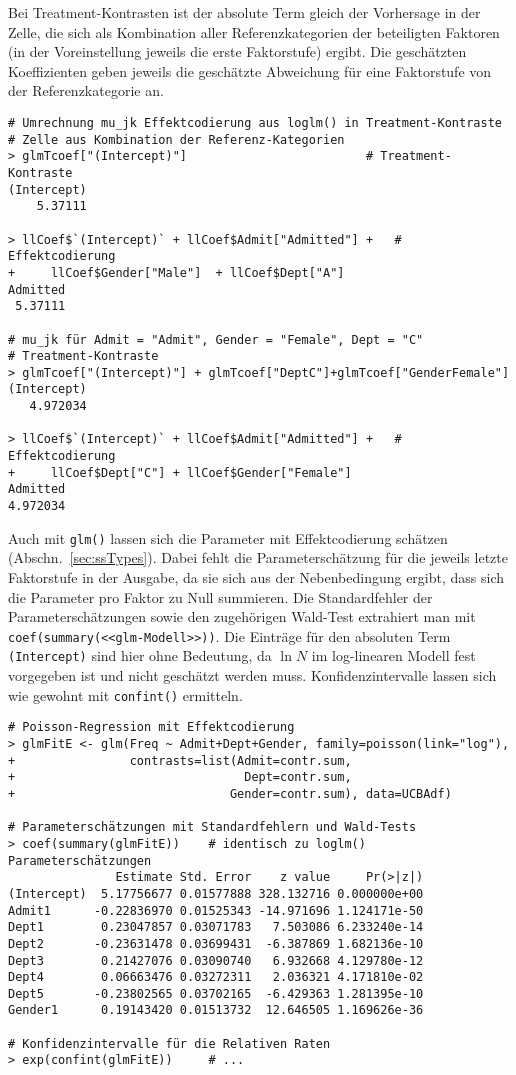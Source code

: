 Bei Treatment-Kontrasten ist der absolute Term gleich der Vorhersage in der Zelle, die sich als Kombination aller Referenzkategorien der beteiligten Faktoren (in der Voreinstellung jeweils die erste Faktorstufe) ergibt. Die geschätzten Koeffizienten geben jeweils die geschätzte Abweichung für eine Faktorstufe von der Referenzkategorie an.
\begin{lstlisting}
# Umrechnung mu_jk Effektcodierung aus loglm() in Treatment-Kontraste
# Zelle aus Kombination der Referenz-Kategorien
> glmTcoef["(Intercept)"]                         # Treatment-Kontraste
(Intercept)
    5.37111

> llCoef$`(Intercept)` + llCoef$Admit["Admitted"] +   # Effektcodierung
+     llCoef$Gender["Male"]  + llCoef$Dept["A"]
Admitted
 5.37111

# mu_jk für Admit = "Admit", Gender = "Female", Dept = "C"
# Treatment-Kontraste
> glmTcoef["(Intercept)"] + glmTcoef["DeptC"]+glmTcoef["GenderFemale"]
(Intercept)
   4.972034

> llCoef$`(Intercept)` + llCoef$Admit["Admitted"] +   # Effektcodierung
+     llCoef$Dept["C"] + llCoef$Gender["Female"]
Admitted
4.972034
\end{lstlisting}

Auch mit \lstinline!glm()! lassen sich die Parameter mit Effektcodierung schätzen (Abschn.\ \ref{sec:ssTypes}). Dabei fehlt die Parameterschätzung für die jeweils letzte Faktorstufe in der Ausgabe, da sie sich aus der Nebenbedingung ergibt, dass sich die Parameter pro Faktor zu Null summieren. Die Standardfehler der Parameterschätzungen sowie den zugehörigen Wald-Test extrahiert man mit \lstinline!coef(summary(<<glm-Modell>>))!. Die Einträge für den absoluten Term \lstinline!(Intercept)! sind hier ohne Bedeutung, da $\ln N$ im log-linearen Modell fest vorgegeben ist und nicht geschätzt werden muss. Konfidenzintervalle lassen sich wie gewohnt mit \lstinline!confint()! ermitteln.
\begin{lstlisting}
# Poisson-Regression mit Effektcodierung
> glmFitE <- glm(Freq ~ Admit+Dept+Gender, family=poisson(link="log"),
+                contrasts=list(Admit=contr.sum,
+                                Dept=contr.sum,
+                              Gender=contr.sum), data=UCBAdf)

# Parameterschätzungen mit Standardfehlern und Wald-Tests
> coef(summary(glmFitE))    # identisch zu loglm() Parameterschätzungen
               Estimate Std. Error    z value     Pr(>|z|)
(Intercept)  5.17756677 0.01577888 328.132716 0.000000e+00
Admit1      -0.22836970 0.01525343 -14.971696 1.124171e-50
Dept1        0.23047857 0.03071783   7.503086 6.233240e-14
Dept2       -0.23631478 0.03699431  -6.387869 1.682136e-10
Dept3        0.21427076 0.03090740   6.932668 4.129780e-12
Dept4        0.06663476 0.03272311   2.036321 4.171810e-02
Dept5       -0.23802565 0.03702165  -6.429363 1.281395e-10
Gender1      0.19143420 0.01513732  12.646505 1.169626e-36

# Konfidenzintervalle für die Relativen Raten
> exp(confint(glmFitE))     # ...
\end{lstlisting}
